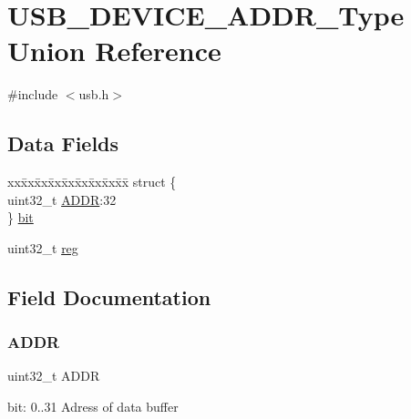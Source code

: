 \hypertarget{union_u_s_b___d_e_v_i_c_e___a_d_d_r___type}{}\section{U\+S\+B\+\_\+\+D\+E\+V\+I\+C\+E\+\_\+\+A\+D\+D\+R\+\_\+\+Type Union Reference}
\label{union_u_s_b___d_e_v_i_c_e___a_d_d_r___type}


{\ttfamily \#include $<$usb.\+h$>$}

\subsection*{Data Fields}
\begin{DoxyCompactItemize}
\item 
\begin{tabbing}
xx\=xx\=xx\=xx\=xx\=xx\=xx\=xx\=xx\=\kill
struct \{\\
\>uint32\_t \mbox{\hyperlink{union_u_s_b___d_e_v_i_c_e___a_d_d_r___type_ac9f49eaa00ec245d66e5342c02bcce9f}{ADDR}}:32\\
\} \mbox{\hyperlink{union_u_s_b___d_e_v_i_c_e___a_d_d_r___type_a2ef6df559a72c6b8eaf84d00b0901c77}{bit}}\\

\end{tabbing}\item 
uint32\+\_\+t \mbox{\hyperlink{union_u_s_b___d_e_v_i_c_e___a_d_d_r___type_a6b91636401516a477989a336376d7b40}{reg}}
\end{DoxyCompactItemize}


\subsection{Field Documentation}
\mbox{\label{union_u_s_b___d_e_v_i_c_e___a_d_d_r___type_ac9f49eaa00ec245d66e5342c02bcce9f}} 
\subsubsection{\texorpdfstring{ADDR}{ADDR}}
{\footnotesize\ttfamily uint32\+\_\+t A\+D\+DR}

bit\+: 0..31 Adress of data buffer \mbox{\label{union_u_s_b___d_e_v_i_c_e___a_d_d_r___type_a2ef6df559a72c6b8eaf84d00b0901c77}} 
